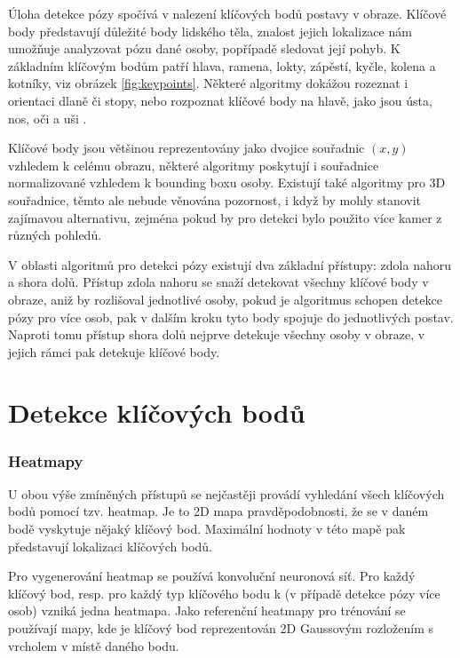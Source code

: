 Úloha detekce pózy spočívá v nalezení klíčových bodů postavy v obraze.
Klíčové body představují důležité body lidského těla, znalost jejich lokalizace
nám umožňuje analyzovat pózu dané osoby, popřípadě sledovat její pohyb. K
základním klíčovým bodům patří hlava, ramena, lokty, zápěstí, kyčle, kolena a
kotníky, viz obrázek \ref{fig:keypoints}. Některé algoritmy dokážou rozeznat i
orientaci dlaně či stopy, nebo rozpoznat klíčové body na hlavě, jako jsou ústa,
nos, oči a uši \cite{blazepose}.

Klíčové body jsou většinou reprezentovány jako dvojice souřadnic $(x, y)$
vzhledem k celému obrazu, některé algoritmy poskytují i souřadnice
normalizované vzhledem k bounding boxu osoby. Existují také algoritmy pro 3D
souřadnice, těmto ale nebude věnována pozornost, i když by mohly stanovit
zajímavou alternativu, zejména pokud by pro detekci bylo použito více kamer z
různých pohledů.

V oblasti algoritmů pro detekci pózy existují dva základní přístupy: zdola
nahoru a shora dolů. Přístup zdola nahoru se snaží detekovat všechny klíčové
body v obraze, aniž by rozlišoval jednotlivé osoby, pokud je algoritmus schopen
detekce pózy pro více osob, pak v dalším kroku tyto body spojuje do
jednotlivých postav. Naproti tomu přístup shora dolů nejprve detekuje všechny
osoby v obraze, v jejich rámci pak detekuje klíčové body.

\section{Detekce klíčových bodů}

\subsubsection*{Heatmapy}

U obou výše zmíněných přístupů se nejčastěji provádí vyhledání všech klíčových
bodů pomocí tzv. heatmap. Je to 2D mapa pravděpodobnosti, že se v daném bodě
vyskytuje nějaký klíčový bod. Maximální hodnoty v této mapě pak představují
lokalizaci klíčových bodů.

Pro vygenerování heatmap se používá konvoluční neuronová síť. Pro každý klíčový
bod, resp. pro každý typ klíčového bodu k (v případě detekce pózy více osob)
vzniká jedna heatmapa. Jako referenční heatmapy pro trénování se používají
mapy, kde je klíčový bod reprezentován 2D Gaussovým rozložením s vrcholem v
místě daného bodu.


